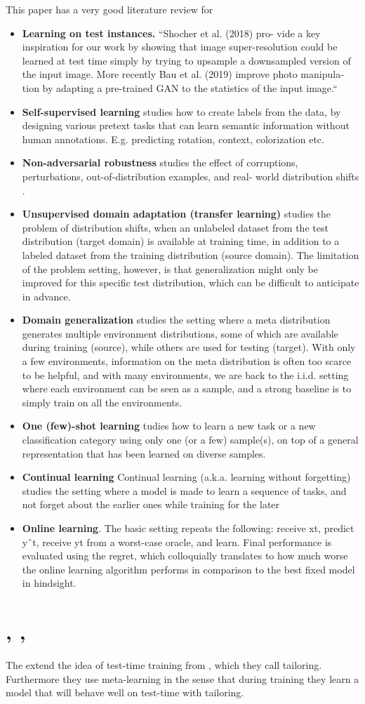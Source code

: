 \documentclass{article}
\newcommand{\citeall}[1]{\citeauthor{#1}, \citetitle{#1}, \citeyear{#1}}
\newcommand{\uls}{\begin{itemize}}
\newcommand{\ule}{\end{itemize}}
\newcommand{\li}{\item}
\begin{document}
This paper has a very good literature review for 
\uls
\li \textbf{Learning on test instances. }
``Shocher et al. (2018) pro- vide a key inspiration for our work by showing that image super-resolution could be learned at test time simply by trying to upsample a downsampled version of the input image. More recently Bau et al. (2019) improve photo manipula- tion by adapting a pre-trained GAN to the statistics of the input image.``
\li \textbf{Self-supervised learning} studies how to create labels from the data, by designing various pretext tasks that can learn semantic information without human annotations. E.g. predicting rotation, context, colorization etc.
\li \textbf{Non-adversarial robustness} studies the effect of corruptions, perturbations, out-of-distribution examples, and real- world distribution shifts \cite{Hendrycks2019BenchmarkingPerturbations}.

\li \textbf{Unsupervised domain adaptation (transfer learning)} studies the problem of distribution shifts, when an unlabeled dataset from the test distribution (target domain) is available at training time, in addition to a labeled dataset from the training distribution (source domain). The limitation of the problem setting, however, is that generalization might only be improved for this specific test distribution, which can be difficult to anticipate in advance.

\li\textbf{ Domain generalization} studies the setting where a meta distribution generates multiple environment distributions, some of which are available during training (source), while others are used for testing (target). With only a few environments, information on the meta distribution is often too scarce to be helpful, and with many environments, we are back to the i.i.d. setting where each environment can be seen as a sample, and a strong baseline is to simply train on all the environments.

\li \textbf{One (few)-shot learning} tudies how to learn a new task or a new classification category using only one (or a few) sample(s), on top of a general representation that has been learned on diverse samples.
\li \textbf{Continual learning} Continual learning (a.k.a. learning without forgetting) studies the setting where a model is made to learn a sequence of tasks, and not forget about the earlier ones while training for the later
\li \textbf{Online learning}. The basic setting repeats the following: receive xt, predict yˆt, receive yt from a worst-case oracle, and learn. Final performance is evaluated using the regret, which colloquially translates to how much worse the online learning algorithm performs in comparison to the best fixed model in hindsight.
\ule 

\section{\citeall{Alet2020Tailoring:Time}}

The extend the idea of test-time training from \cite{Sun2019Test-TimeShifts}, which they call tailoring. Furthermore they use meta-learning in the sense that during training they learn a model that will behave well on test-time with tailoring.


\printbibliography
\end{document}
